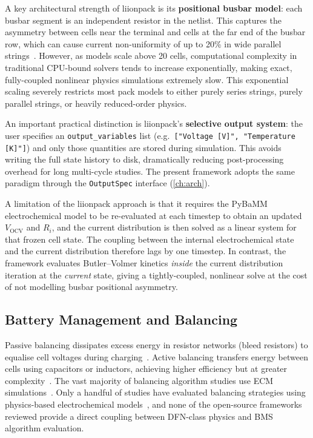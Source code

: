 A key architectural strength of liionpack is its \textbf{positional busbar model}: each busbar segment is an independent resistor in the netlist. This captures the asymmetry between cells near the terminal and cells at the far end of the busbar row, which can cause current non-uniformity of up to 20\% in wide parallel strings~\cite{Tranter2022}. However, as models scale above 20 cells, computational complexity in traditional CPU-bound solvers tends to increase exponentially, making exact, fully-coupled nonlinear physics simulations extremely slow. This exponential scaling severely restricts most pack models to either purely series strings, purely parallel strings, or heavily reduced-order physics.

An important practical distinction is liionpack's \textbf{selective output system}: the user specifies an \texttt{output\_variables} list (e.g.~\texttt{["Voltage [V]", "Temperature [K]"]}) and only those quantities are stored during simulation. This avoids writing the full state history to disk, dramatically reducing post-processing overhead for long multi-cycle studies. The present framework adopts the same paradigm through the \texttt{OutputSpec} interface (\cref{ch:arch}).

A limitation of the liionpack approach is that it requires the PyBaMM electrochemical model to be re-evaluated at each timestep to obtain an updated $V_\text{OCV}$ and $R_i$, and the current distribution is then solved as a linear system for that frozen cell state. The coupling between the internal electrochemical state and the current distribution therefore lags by one timestep. In contrast, the \VIBE{} framework evaluates Butler--Volmer kinetics \emph{inside} the current distribution iteration at the \emph{current} state, giving a tightly-coupled, nonlinear solve at the cost of not modelling busbar positional asymmetry.

\subsection{Battery Management and Balancing}
\label{ssec:lit_bms}

Passive balancing dissipates excess energy in resistor networks (bleed resistors) to equalise cell voltages during charging~\cite{Daowd2011}. Active balancing transfers energy between cells using capacitors or inductors, achieving higher efficiency but at greater complexity~\cite{Baughman2008}. The vast majority of balancing algorithm studies use ECM simulations~\cite{Ouyang2018,Zheng2014}. Only a handful of studies have evaluated balancing strategies using physics-based electrochemical models~\cite{Perez2016}, and none of the open-source frameworks reviewed provide a direct coupling between DFN-class physics and BMS algorithm evaluation.

